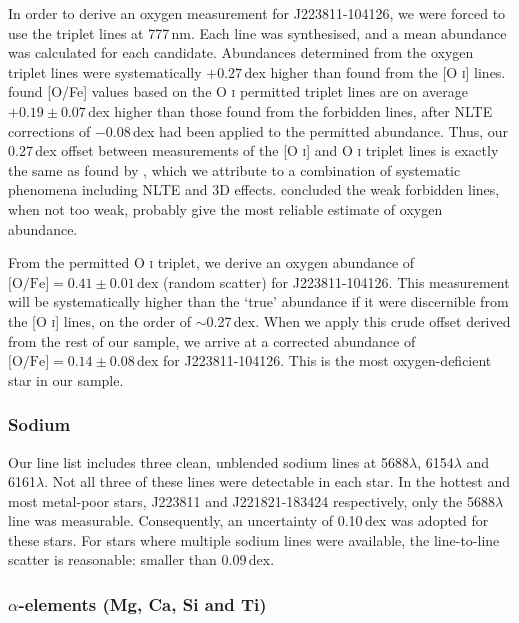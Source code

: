 \documentclass{emulateapj}
\begin{document}
In order to derive an oxygen measurement for J223811-104126, we were forced to use the triplet lines at 777\,nm. Each line was synthesised, and a mean abundance was calculated for each candidate. Abundances determined from the oxygen triplet lines were systematically $+0.27$\,dex higher than found from the [O \textsc{i}] lines. \citet{perez;et-al_2006} found [O/Fe] values based on the O \textsc{i} permitted triplet lines are on average $+0.19 \pm 0.07$\,dex higher than those found from the forbidden lines, after NLTE corrections of $-$0.08\,dex had been applied to the permitted abundance.  Thus, our 0.27\,dex offset between measurements of the [O \textsc{i}] and O \textsc{i} triplet lines is exactly the same as found by \citet{perez;et-al_2006}, which we attribute to a combination of systematic phenomena including NLTE and 3D effects. \citet{perez;et-al_2006} concluded the weak forbidden lines, when not too weak, probably give the most reliable estimate of oxygen abundance.

From the permitted O \textsc{i} triplet, we derive an oxygen abundance of $\mbox{[O/Fe]} = 0.41 \pm 0.01$\,dex (random scatter) for J223811-104126. This measurement will be systematically higher than the `true' abundance if it were discernible from the [O \textsc{i}] lines, on the order of ${\sim}$0.27\,dex. When we apply this crude offset derived from the rest of our sample, we arrive at a corrected abundance of $\mbox{[O/Fe]} = 0.14 \pm 0.08$\,dex for J223811-104126. This is the most oxygen-deficient star in our sample.


\subsubsection{Sodium}
\label{sec:sodium-abundances}
Our line list includes three clean, unblended sodium lines at 5688$\lambda$, 6154$\lambda$ and 6161$\lambda$. Not all three of these lines were detectable in each star. In the hottest and most metal-poor stars, J223811 and J221821-183424 respectively, only the 5688$\lambda$ line was measurable. Consequently, an uncertainty of 0.10\,dex was adopted for these stars. For stars where multiple sodium lines were available, the line-to-line scatter is reasonable: smaller than 0.09\,dex. 


\subsubsection{$\alpha$-elements (Mg, Ca, Si and Ti)}
\label{sec:alpha-elements}
\end{document}

